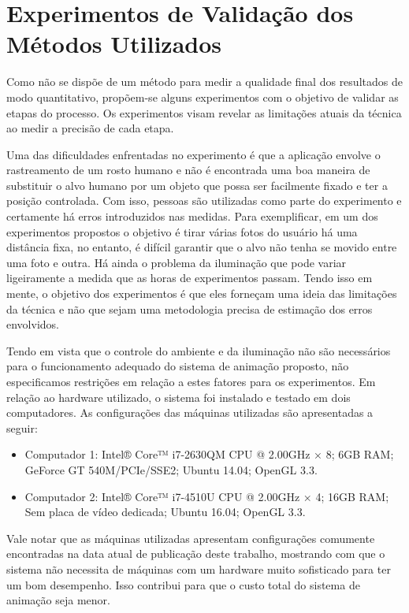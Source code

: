

\section{Experimentos de Validação dos Métodos Utilizados}

Como não se dispõe de um método para medir a qualidade final dos resultados de
modo quantitativo, propõem-se alguns experimentos com o objetivo de validar as
etapas do processo. Os experimentos visam revelar as limitações atuais da
técnica ao medir a precisão de cada etapa.

Uma das dificuldades enfrentadas no experimento é que a aplicação envolve o
rastreamento de um rosto humano e não é encontrada uma boa maneira de substituir
o alvo humano por um objeto que possa ser facilmente fixado e ter a posição
controlada. Com isso, pessoas são utilizadas como parte do experimento e
certamente há erros introduzidos nas medidas. Para exemplificar, em um dos
experimentos propostos o objetivo é tirar várias fotos do usuário há uma
distância fixa, no entanto, é difícil garantir que o alvo não tenha se movido
entre uma foto e outra. Há ainda o problema da iluminação que pode variar
ligeiramente a medida que as horas de experimentos passam. Tendo isso em mente,
o objetivo dos experimentos é que eles forneçam uma ideia das limitações da
técnica e não que sejam uma metodologia precisa de estimação dos erros
envolvidos. 

Tendo em vista que o controle do ambiente e da iluminação não são necessários para o
funcionamento adequado do sistema de animação proposto, não especificamos 
restrições em relação a estes fatores para os experimentos. Em relação ao hardware 
utilizado, o sistema foi instalado e testado em dois computadores. As configurações das 
máquinas utilizadas são apresentadas a seguir: 

\begin{itemize}
\item Computador 1: Intel® Core™ i7-2630QM CPU @ 2.00GHz × 8; 6GB RAM; GeForce GT 540M/PCIe/SSE2;
Ubuntu 14.04; OpenGL 3.3.
\item Computador 2: Intel® Core™ i7-4510U CPU @ 2.00GHz × 4; 16GB RAM; Sem placa de vídeo
dedicada; Ubuntu 16.04; OpenGL 3.3.
\end{itemize}

Vale notar que as máquinas utilizadas apresentam configurações comumente encontradas na data 
atual de publicação deste trabalho, mostrando com que o sistema não necessita de máquinas
com um hardware muito sofisticado para ter um bom desempenho. Isso contribui para que o 
custo total do sistema de animação seja menor.

